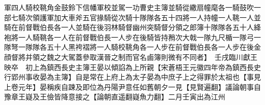 軍四人騎校鞉角金鼓鈴下信幡軍校並駕一功曹史主簿並騎從繖扇幢麾各一騎鼓吹一部七騎次領護軍加大車斧五官掾騎從次騎十隊隊各五十四將一人持幢一人鞉一人並騎在前督戰伯長各一人並騎在後羽林騎督幽州突騎督分領之郎簿十隊隊各五十人絳袍將一人騎鞉各一人在前督戰伯長一人步在後騎皆持矟次大戟一隊九尺楯一隊弓一隊弩一隊隊各五十人黑袴褶將一人騎校鞉角各一人步在前督戰伯長各一人步在後金顔督將并領之魏之大駕蓋參取漢晉之制而官名鹵簿則微有不同者】　壬戌臨川獻王映卒　初上為鎮西長史主簿王晏以傾諂為上所親【宋蒼梧王元徽四年帝為鎮西長史行郢州事收晏為主簿】自是常在上府上為太子晏為中庶子上之得罪於太祖也【事見上卷元年】晏稱疾自踈及即位為丹陽尹意任如舊朝夕一見【見賢遍翻】議論朝事自豫章王嶷及王儉皆降意接之【論朝直遥翻嶷魚力翻】二月壬寅出為江州